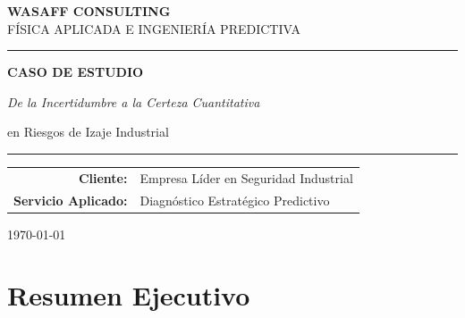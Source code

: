 \documentclass[11pt, a4paper, spanish]{article}
\begin{document}
\thispagestyle{empty}

\begin{titlepage}
    \begin{center}
        \vspace*{1cm}
        {\LARGE \textbf{WASAFF CONSULTING}} \\
        \vspace{0.2cm}
        {\scshape \small FÍSICA APLICADA E INGENIERÍA PREDICTIVA}
        \vspace{3cm}
        \rule{\textwidth}{0.8pt}
        \vspace{0.2cm}
        {\Huge\bfseries CASO DE ESTUDIO}
        \vspace{0.5cm}\\
        {\Large\itshape De la Incertidumbre a la Certeza Cuantitativa\par en Riesgos de Izaje Industrial}
        \vspace{0.2cm}
        \rule{\textwidth}{0.8pt}
        \vfill
        \begin{tabular}{rl}
            \textbf{Cliente:} & Empresa Líder en Seguridad Industrial \\
            \textbf{Servicio Aplicado:} & Diagnóstico Estratégico Predictivo \\
        \end{tabular}
        \vfill
        \vfill
        \small {\today}
    \end{center}
\end{titlepage}
\clearpage

\section*{Resumen Ejecutivo}
\end{document}
